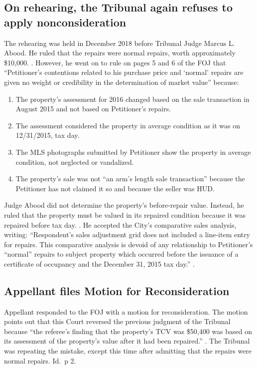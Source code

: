 \documentclass[12pt,\documentclassflag]{michiganCourtOfAppealsBrief}
\begin{document}
\subsection{On rehearing, the Tribunal again refuses to apply nonconsideration}

The rehearing was held in December 2018 before Tribunal Judge Marcus L. Abood. He ruled that the repairs were normal repairs, worth approximately \$10,000. \foj[4]. However, he went on to rule on pages 5 and 6 of the FOJ that ``Petitioner's contentions related to his purchase price and `normal' repairs are given no weight or credibility in the determination of market value'' because:
\begin{enumerate}
\item The property's assessment for 2016 changed based on the sale transaction in August 2015 and not based on Petitioner's repairs. 
\item The assessment considered the property in average condition as it was on 12/31/2015, tax day.
\item The MLS photographs submitted by Petitioner show the property in average condition, not neglected or vandalized.
\item The property's sale was not ``an arm's length sale transaction'' because the Petitioner has not claimed it so and because the seller was HUD.
\end{enumerate}

Judge Abood did not determine the property's before-repair value. Instead, he ruled that the property must be valued in its repaired condition because it was repaired before tax day. \foj[5]. He accepted the City's comparative sales analysis, writing: ``Respondent's sales adjustment grid does not included a line-item entry for repairs. This comparative analysis is devoid of any relationship to Petitioner's ``normal'' repairs to subject property which occurred before the issuance of a certificate of occupancy and the December 31, 2015 tax day.'' \foj[6].

\subsection{Appellant files Motion for Reconsideration}

Appellant responded to the FOJ with a motion for reconsideration. The motion points out that this Court reversed the previous judgment of the Tribunal because  ``the referee's finding that the property's TCV was \$50,400 was based on its assessment of the property's value after it had been repaired.'' \motionForReconsideration[1]. The Tribunal was repeating the mistake, except this time after admitting that the repairs were normal repairs. Id.\ p 2. 
\end{document}
